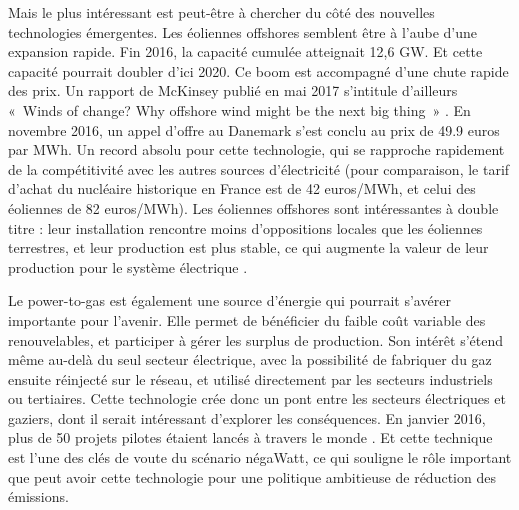 Mais le plus intéressant est peut-être à chercher du côté des nouvelles technologies émergentes. 
Les éoliennes offshores semblent être à l’aube d’une expansion rapide. Fin 2016, la capacité cumulée atteignait 12,6 GW. Et cette capacité pourrait doubler d’ici 2020. Ce boom est accompagné d’une chute rapide des prix. Un rapport de McKinsey publié en mai 2017 s’intitule d’ailleurs «~Winds of change? Why offshore wind might be the next big thing~» \citep{McKinsey2017Wind}. En novembre 2016, un appel d’offre au Danemark s’est conclu au prix de 49.9 euros par MWh. Un record absolu pour cette technologie, qui se rapproche rapidement de la compétitivité avec les autres sources d’électricité (pour comparaison, le tarif d'achat du nucléaire historique en France est de 42 euros/MWh, et celui des éoliennes de 82 euros/MWh). Les éoliennes offshores sont intéressantes à double titre : leur installation rencontre moins d’oppositions locales que les éoliennes terrestres, et leur production est plus stable, ce qui augmente la valeur de leur production pour le système électrique \citep{Hirth2016}.

Le power-to-gas est également une source d’énergie qui pourrait s’avérer importante pour l’avenir. Elle permet de bénéficier du faible coût variable des renouvelables, et participer à gérer les surplus de production. Son intérêt s’étend même au-delà du seul secteur électrique, avec la possibilité de fabriquer du gaz ensuite réinjecté sur le réseau, et utilisé directement par les secteurs industriels ou tertiaires. Cette technologie crée donc un pont entre les secteurs électriques et gaziers, dont il serait intéressant d’explorer les conséquences. En janvier 2016, plus de 50 projets pilotes étaient lancés à travers le monde \citep{EneaConsulting2016}. Et cette technique est l’une des clés de voute du scénario négaWatt, ce qui souligne le rôle important que peut avoir cette technologie pour une politique ambitieuse de réduction des émissions.


